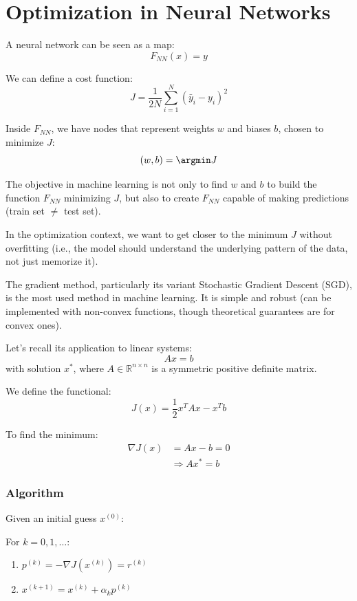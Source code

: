 

\section{Optimization in Neural Networks}

A neural network can be seen as a map:
\[
F_{NN}(x) = y
\]

We can define a cost function:
\[
J = \frac{1}{2N} \sum_{i=1}^{N} (\bar{y}_i - y_i)^2
\]

Inside $F_{NN}$, we have nodes that represent weights $w$ and biases $b$, chosen to minimize $J$:
\[
(w, b) = \argmin J
\]

The objective in machine learning is not only to find $w$ and $b$ to build the function $F_{NN}$ minimizing $J$, but also to create $F_{NN}$ capable of making predictions (train set $\neq$ test set).

In the optimization context, we want to get closer to the minimum $J$ without overfitting (i.e., the model should understand the underlying pattern of the data, not just memorize it).

The gradient method, particularly its variant Stochastic Gradient Descent (SGD), is the most used method in machine learning. It is simple and robust (can be implemented with non-convex functions, though theoretical guarantees are for convex ones).

Let's recall its application to linear systems:
\[
Ax = b
\]
with solution $x^*$, where $A \in \mathbb{R}^{n \times n}$ is a symmetric positive definite matrix.

We define the functional:
\[
J(x) = \frac{1}{2} x^T A x - x^T b
\]

To find the minimum:
\[
\begin{aligned}
\nabla J(x) &= Ax - b = 0 \\
&\Rightarrow Ax^* = b
\end{aligned}
\]

\subsubsection*{Algorithm}
Given an initial guess $x^{(0)}$:

For $k = 0, 1, \ldots$:
\begin{enumerate}
    \item $p^{(k)} = -\nabla J(x^{(k)}) = r^{(k)}$
    \item $x^{(k+1)} = x^{(k)} + \alpha_k p^{(k)}$
\end{enumerate}

